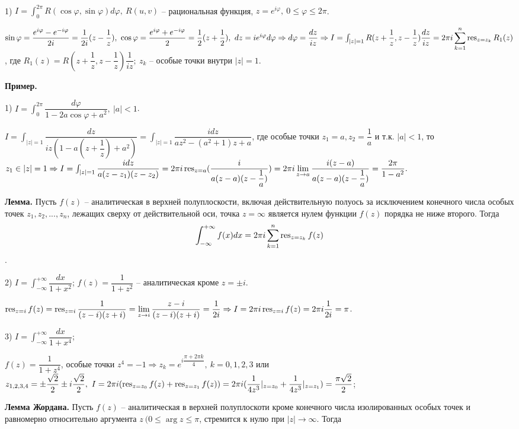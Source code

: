 \documentclass[9pt]{article}
\begin{document}
\ 
\par1) \(I=\int^{2\pi}_0R(\cos\varphi,\sin\varphi)d\varphi,\ R(u,v)\) -- рациональная функция, \(z=e^{i\varphi},\ 0\le\varphi\le2\pi\).
\par\(\sin\varphi=\dfrac{e^{i\varphi}-e^{-i\varphi}}{2i}=\dfrac{1}{2i}(z-\dfrac{1}{z}),\ \cos\varphi=\dfrac{e^{i\varphi}+e^{-i\varphi}}{2}=\dfrac{1}{2}(z+\dfrac{1}{2}),\ dz=ie^{i\varphi}d\varphi\Rightarrow d\varphi=\dfrac{dz}{iz}\Rightarrow I=\int_{|z|=1}R(z+\dfrac{1}{z}, z-\dfrac{1}{z})\dfrac{dz}{iz}=2\pi i\displaystyle\sum_{k=1}^n \res_{z=z_k}R_1(z)\), где \(R_1(z)=R(z+\dfrac{1}{z},z-\dfrac{1}{z})\dfrac{1}{iz};\ z_k\) -- особые точки внутри \(|z|=1\).
\par\textbf{Пример.}
\par1) \(I=\int_0^{2\pi}\dfrac{d\varphi}{1-2a\cos\varphi+a^2},\ |a|<1\).
\par\(I=\int_{|z|=1}\dfrac{dz}{iz(1-a(z+\dfrac{1}{z})+a^2)}=\int_{|z|=1}\dfrac{idz}{az^2-(a^2+1)z+a}\), где особые точки \(z_1=a,z_2=\dfrac{1}{a}\) и т.к. \(|a|<1\), то \(z_1\in|z|=1\Rightarrow I=\int_{|z|=1}\dfrac{idz}{a(z-z_1)(z-z_2)}=2\pi i\displaystyle\operatorname{res}_{z=a}(\dfrac{i}{a(z-a)(z-\dfrac{1}{a})})=2\pi i\lim_{z\to a}\dfrac{i(z-a)}{a(z-a)(z-\dfrac{1}{a})}=\dfrac{2\pi}{1-a^2}.\)
\par\textbf{Лемма.} Пусть \(f(z)\) -- аналитическая в верхней полуплоскости, включая действительную полуось за исключением конечного числа особых точек \(z_1,z_2,...,z_n\), лежащих сверху от действительной оси, точка \(z=\infty\) является нулем функции \(f(z)\) порядка не ниже второго. Тогда
\begin{equation}
    \int_{-\infty}^{+\infty}f(x)dx=2\pi i\displaystyle\sum_{k=1}^n\operatorname{res}_{z=z_k}f(z)
\end{equation}.
\par2) \(I=\int_{-\infty}^{+\infty}\dfrac{dx}{1+x^2}\); \(f(z)=\dfrac{1}{1+z^2}\) -- аналитическая кроме \(z=\pm i\).
\par\(\operatorname{res}_{z=i}f(z)=\operatorname{res}_{z=i}\dfrac{1}{(z-i)(z+i)}=\displaystyle\lim_{z\to i}\dfrac{z-i}{(z-i)(z+i)}=\dfrac{1}{2i}\Rightarrow I=2\pi i\operatorname{res}_{z=i}f(z)=2\pi i\dfrac{1}{2i}=\pi\).
\par3) \(I=\int_{-\infty}^{+\infty}\dfrac{dx}{1+x^4}\);
\par\(f(z)=\dfrac{1}{1+z^4}\), особые точки \(z^4=-1\Rightarrow z_k=e^{i\dfrac{\pi+2\pi k}{4}},\ k=0,1,2,3\) или \(z_{1,2,3,4}=\pm\dfrac{\sqrt{2}}{2}\pm i\dfrac{\sqrt{2}}{2},\ I=2\pi i(\operatorname{res}_{z=z_0}f(z)+\operatorname{res}_{z=z_1}f(z))=2\pi i(\dfrac{1}{4z^3}|_{z=z_0}+\dfrac{1}{4z^3}|_{z=z_1})=\dfrac{\pi\sqrt{2}}{2}\);
\par\textbf{Лемма Жордана.} Пусть \(f(z)\) -- аналитическая в верхней полуплоскоти кроме конечного числа изолированных особых точек и равномерно относительно аргумента \(z\ (0\le\arg z\le\pi\), стремится к нулю при \(|z|\to\infty\). Тогда
\end{document}
